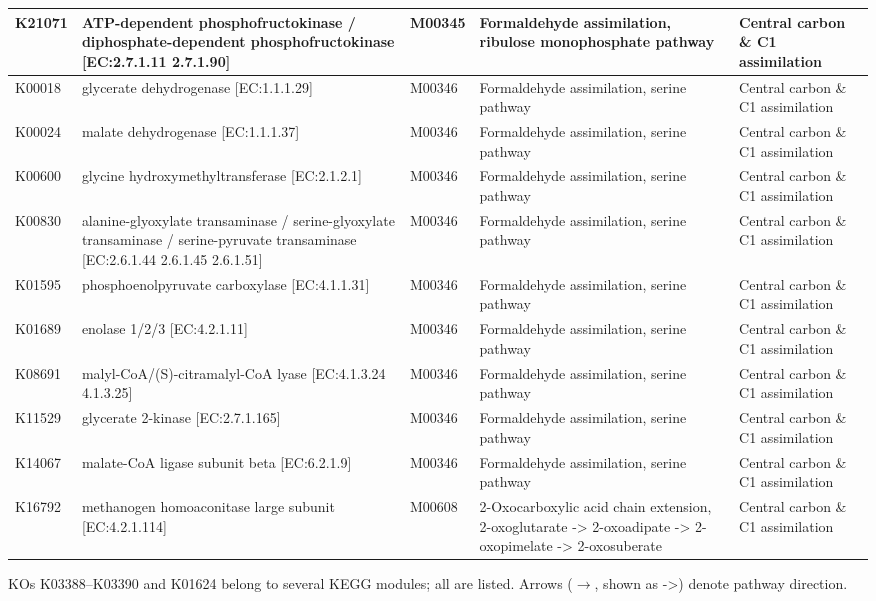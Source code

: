 {\begin{longtable}{|l|p{4.5cm}|p{2.3cm}|p{3.7cm}|p{2.5cm}|}
K21071 & ATP-dependent phosphofructokinase / diphosphate-dependent phosphofructokinase [EC:2.7.1.11 2.7.1.90] & M00345 & Formaldehyde assimilation, ribulose monophosphate pathway & Central carbon \& C1 assimilation \\ \hline
K00018 & glycerate dehydrogenase [EC:1.1.1.29] & M00346 & Formaldehyde assimilation, serine pathway & Central carbon \& C1 assimilation \\ \hline
K00024 & malate dehydrogenase [EC:1.1.1.37] & M00346 & Formaldehyde assimilation, serine pathway & Central carbon \& C1 assimilation \\ \hline
K00600 & glycine hydroxymethyltransferase [EC:2.1.2.1] & M00346 & Formaldehyde assimilation, serine pathway & Central carbon \& C1 assimilation \\ \hline
K00830 & alanine-glyoxylate transaminase / serine-glyoxylate transaminase / serine-pyruvate transaminase [EC:2.6.1.44 2.6.1.45 2.6.1.51] & M00346 & Formaldehyde assimilation, serine pathway & Central carbon \& C1 assimilation \\ \hline
K01595 & phosphoenolpyruvate carboxylase [EC:4.1.1.31] & M00346 & Formaldehyde assimilation, serine pathway & Central carbon \& C1 assimilation \\ \hline
K01689 & enolase 1/2/3 [EC:4.2.1.11] & M00346 & Formaldehyde assimilation, serine pathway & Central carbon \& C1 assimilation \\ \hline
K08691 & malyl-CoA/(S)-citramalyl-CoA lyase [EC:4.1.3.24 4.1.3.25] & M00346 & Formaldehyde assimilation, serine pathway & Central carbon \& C1 assimilation \\ \hline
K11529 & glycerate 2-kinase [EC:2.7.1.165] & M00346 & Formaldehyde assimilation, serine pathway & Central carbon \& C1 assimilation \\ \hline
K14067 & malate-CoA ligase subunit beta [EC:6.2.1.9] & M00346 & Formaldehyde assimilation, serine pathway & Central carbon \& C1 assimilation \\ \hline
K16792 & methanogen homoaconitase large subunit [EC:4.2.1.114] & M00608 & 2-Oxocarboxylic acid chain extension, 2-oxoglutarate -> 2-oxoadipate -> 2-oxopimelate -> 2-oxosuberate & Central carbon \& C1 assimilation \\ \hline
\end{longtable}
\begin{flushleft}\footnotesize
KOs K03388--K03390 and K01624 belong to several KEGG modules; all are listed. Arrows ($\rightarrow$, shown as ->) denote pathway direction.
\end{flushleft}
}
